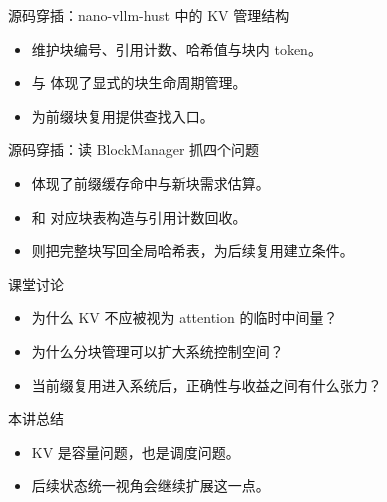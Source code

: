 \begin{frame}{源码穿插：nano-vllm-hust 中的 KV 管理结构}
  \begin{itemize}
    \item \texttt{} 维护块编号、引用计数、哈希值与块内 token。
    \item \texttt{} 与 \texttt{} 体现了显式的块生命周期管理。
    \item \texttt{} 为前缀块复用提供查找入口。
  \end{itemize}
\end{frame}

\begin{frame}{源码穿插：读 BlockManager 抓四个问题}
  \begin{itemize}
    \item \texttt{} 体现了前缀缓存命中与新块需求估算。
    \item \texttt{} 和 \texttt{} 对应块表构造与引用计数回收。
    \item \texttt{} 则把完整块写回全局哈希表，为后续复用建立条件。
  \end{itemize}
\end{frame}



\begin{frame}{课堂讨论}
  \begin{itemize}
    \item 为什么 KV 不应被视为 attention 的临时中间量？
    \item 为什么分块管理可以扩大系统控制空间？
    \item 当前缀复用进入系统后，正确性与收益之间有什么张力？
  \end{itemize}
\end{frame}

\begin{frame}{本讲总结}
  \begin{itemize}
    \item KV 是容量问题，也是调度问题。
    \item 后续状态统一视角会继续扩展这一点。
  \end{itemize}
\end{frame}

